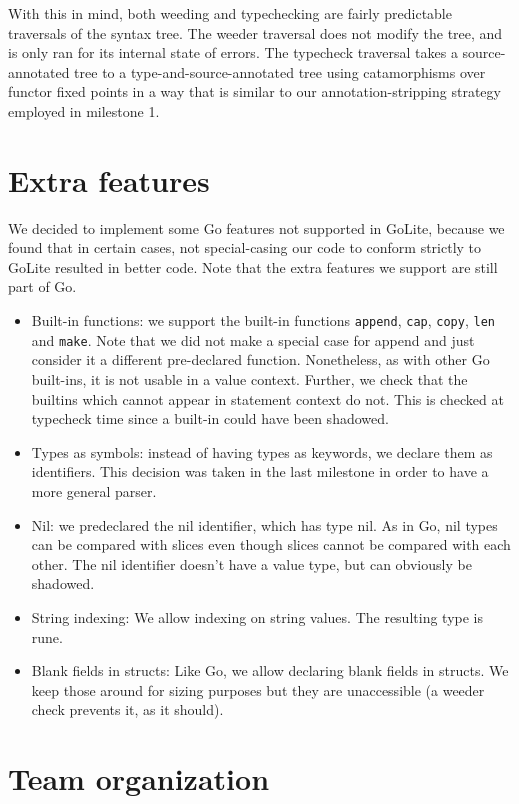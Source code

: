\documentclass[letterpaper,11pt]{article}
\begin{document}
With this in mind, both weeding and typechecking are fairly predictable traversals of the syntax tree. The weeder traversal does not modify the tree, and is only ran for its internal state of errors. The typecheck traversal takes a source-annotated tree to a type-and-source-annotated tree using catamorphisms over functor fixed points in a way that is similar to our annotation-stripping strategy employed in milestone 1.

\section{Extra features}
We decided to implement some Go features not supported in GoLite, because we found that in certain cases, not special-casing our code to conform strictly to GoLite resulted in better code. Note that the extra features we support are still part of Go.
\begin{itemize}
\item Built-in functions: we support the built-in functions \texttt{append}, \texttt{cap}, \texttt{copy}, \texttt{len} and \texttt{make}. Note that we did not make a special case for append and just consider it a different pre-declared function. Nonetheless, as with other Go built-ins, it is not usable in a value context. Further, we check that the builtins which cannot appear in statement context do not. This is checked at typecheck time since a built-in could have been shadowed.
\item Types as symbols: instead of having types as keywords, we declare them as identifiers. This decision was taken in the last milestone in order to have a more general parser.
\item Nil: we predeclared the nil identifier, which has type nil. As in Go, nil types can be compared with slices even though slices cannot be compared with each other. The nil identifier doesn't have a value type, but can obviously be shadowed.
\item String indexing: We allow indexing on string values. The resulting type is rune.
\item Blank fields in structs: Like Go, we allow declaring blank fields in structs. We keep those around for sizing purposes but they are unaccessible (a weeder check prevents it, as it should).
\end{itemize}

\section{Team organization}
\end{document}
